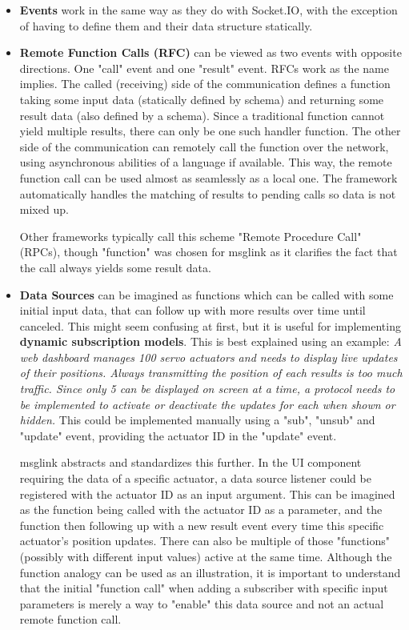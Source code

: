\documentclass[conference]{IEEEtran}
\begin{document}
\begin{itemize}
    \item \textbf{Events} work in the same way as they do with Socket.IO, with the exception of having to define them and their data structure statically.
    \item \textbf{Remote Function Calls (RFC)} can be viewed as two events with opposite directions. One "call" event and one "result" event. RFCs work as the name implies. The called (receiving) side of the communication defines a function taking some input data (statically defined by schema) and returning some result data (also defined by a schema). Since a traditional function cannot yield multiple results, there can only be one such handler function. The other side of the communication can remotely call the function over the network, using asynchronous abilities of a language if available. This way, the remote function call can be used almost as seamlessly as a local one. The framework automatically handles the matching of results to pending calls so data is not mixed up. 

    Other frameworks typically call this scheme "Remote Procedure Call" (RPCs), though "function" was chosen for msglink as it clarifies the fact that the call always yields some result data.
    \item \textbf{Data Sources} can be imagined as functions which can be called with some initial input data, that can follow up with more results over time until canceled. This might seem confusing at first, but it is useful for implementing \textbf{dynamic subscription models}. This is best explained using an example: \textit{A web dashboard manages 100 servo actuators and needs to display live updates of their positions. Always transmitting the position of each results is too much traffic. Since only 5 can be displayed on screen at a time, a protocol needs to be implemented to activate or deactivate the updates for each when shown or hidden.} This could be implemented manually using a "sub", "unsub" and "update" event, providing the actuator ID in the "update" event.
    
    msglink abstracts and standardizes this further. In the UI component requiring the data of a specific actuator, a data source listener could be registered with the actuator ID as an input argument. This can be imagined as the function being called with the actuator ID as a parameter, and the function then following up with a new result event every time this specific actuator's position updates. There can also be multiple of those "functions" (possibly with different input values) active at the same time. Although the function analogy can be used as an illustration, it is important to understand that the initial "function call" when adding a subscriber with specific input parameters is merely a way to "enable" this data source and not an actual remote function call.
\end{itemize}
\end{document}
